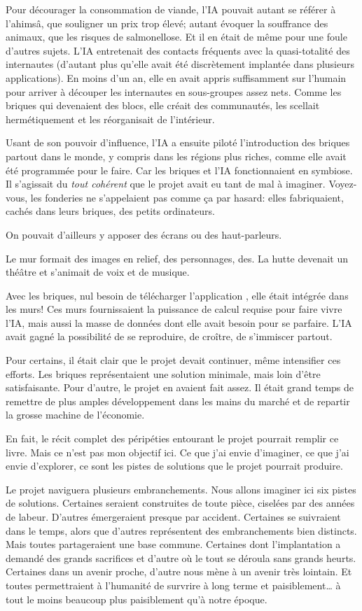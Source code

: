 Pour décourager la consommation de viande, l'IA pouvait autant se référer à
l'ahimsâ, que souligner un prix trop élevé; autant évoquer la souffrance des
animaux, que les risques de salmonellose.  Et il en était de même pour une
foule d'autres sujets. L'IA entrete\-nait des contacts fréquents avec la
quasi-totalité des internautes (d'autant plus qu'elle avait été
dis\-crè\-tement implantée dans plusieurs applications).  En moins d'un an,
elle en avait appris suffisam\-ment sur l'humain pour arriver à découper les
internautes en sous-groupes assez nets.  Comme les briques qui devenaient des
blocs, elle créait des com\-munautés, les scellait herméti\-que\-ment et les
réorganisait de l'intérieur.

Usant de son pouvoir d'influence, l'IA a ensuite piloté l'introduction
des briques partout dans le monde, y compris dans les régions plus riches,
comme elle avait été programmée pour le faire. Car
les briques et l'IA fonctionnaient en symbiose. Il s'agissait du \textit{tout
cohérent} que le projet \nomProjet{} avait eu tant de mal à imaginer.
Voyez-vous, les fonderies ne s'appelaient pas comme ça par hasard: elles
fabri\-quaient, cachés dans leurs briques, des petits ordinateurs.  


On pouvait
d'ail\-leurs y apposer des écrans ou des haut-parleurs. 

Le mur formait des images en relief, des personnages, des.
La hutte devenait un théâtre et s'animait de voix et de musique.

Avec les briques, nul
besoin de télécharger l'application \nomProjet{}, elle était intégrée dans les
murs!  Ces murs fournissaient la puissance de calcul requise pour faire vivre
l'IA, mais aussi la masse de données dont elle avait besoin pour se parfaire.
L'IA avait gagné la possibilité de se reproduire, de croître, de s'immiscer
partout.

Pour certains, il était clair que le projet \nomProjet{} devait continuer, même
intensifier ces efforts.  Les briques représentaient une solution minimale,
mais loin d'être satisfaisante.  Pour d'autre, le projet en avaient fait assez.
Il était grand temps de remettre de plus amples développement dans les mains du
marché et de repartir la grosse machine de l'économie.

En fait, le récit complet des péripéties entourant le projet \nomProjet{} pourrait
remplir ce livre. Mais ce n'est pas mon objectif ici. 
Ce que j'ai envie d'imaginer, ce que j'ai envie d'explorer, ce sont les pistes de solutions
que le projet pourrait produire.


Le projet \nomProjet{} naviguera plusieurs embranchements.  Nous allons
imaginer ici six pistes de solutions.  Certaines seraient construites de toute
pièce, ciselées par des années de labeur.  D'autres émergeraient presque par
accident.  Certaines se suivraient dans le temps, alors que d'autres
représentent des embranchements bien distincts. Mais toutes partageraient une
base commune.  
Certaines dont l'implantation a demandé des grands sacrifices et d'autre où le tout se déroula
sans grands heurts. 
Certaines dans un avenir proche, d'autre nous mène à un avenir très lointain.
Et toutes permettraient à l'humanité de survrire à long terme et
paisiblement\ldots{} à tout le moins beaucoup plus paisiblement qu'à notre
époque.
